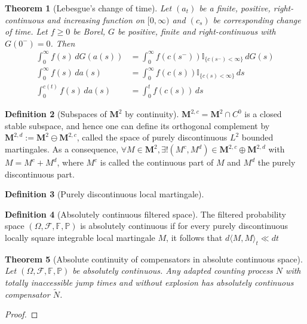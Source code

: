 \documentclass[openany,oneside]{book}
\newtheorem{thm}{Theorem}[section]
\theoremstyle{definition}
\newtheorem{defn}[thm]{Definition}
\theoremstyle{remark}
\renewcommand{\P}{\mathbb{P}} %
\newcommand{\I}{\mathbb{I}} %
\begin{document}
\begin{thm}[Lebesgue's change of time]
Let $(a_t)$ be a finite, positive, right-continuous and increasing function on $[0,\infty)$ and $(c_s)$ be corresponding change of time. Let $f\ge 0$ be Borel, $G$ be positive, finite and right-continuous with $G(0^-)=0$. Then
\begin{align*}
\int_0^\infty f(s) \,d G(a(s)) &= \int_0^\infty f(c(s^-))\I_{\{c(s^-)<\infty\}} \,d G(s) \\
\int_0^\infty f(s) \,d a(s) &= \int_0^\infty f(c(s))\I_{\{c(s)<\infty\}} \,d s \\
\int_0^{c(t)} f(s) \,d a(s) &= \int_0^t f(c(s)) \,d s
\end{align*}
\end{thm}

\begin{defn}[Subspaces of $\mathbf{M}^2$ by continuity]
$\mathbf{M}^{2,c} = \mathbf{M}^2 \cap C^0$ is a closed stable subspace, and hence one can define its orthogonal complement by $\mathbf{M}^{2,d}:=\mathbf{M}^{2} \ominus \mathbf{M}^{2,c}$, called the space of purely discontinuous $L^2$ bounded martingales. As a consequence, $\forall M\in \mathbf{M}^2, \exists ! (M^c, M^d) \in \mathbf{M}^{2,c} \oplus \mathbf{M}^{2,d}$ with $M=M^c + M^d$, where $M^c$ is called the continuous part of $M$ and $M^d$ the purely discontinuous part. 
\end{defn}

\begin{defn}[Purely discontinuous local martingale]

\end{defn}


\begin{defn}[Absolutely continuous filtered space]
The filtered probability space $(\Omega, \mathcal{F}, \mathbb{F}, \P)$ is absolutely continuous if for every purely discontinuous locally square integrable local martingale $M$, it follows that $d\langle M,M\rangle_t \ll d t$
\end{defn}

\begin{thm}[Absolute continuity of compensators in absolute continuous space]
Let $(\Omega, \mathcal{F}, \mathbb{F}, \P)$ be absolutely continuous. Any adapted counting process $N$ with totally inaccessible jump times and without explosion has absolutely continuous compensator $\tilde{N}$.
\end{thm}
\begin{proof}

\end{proof}
\end{document}

